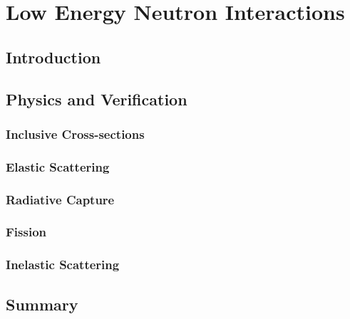 \chapter{Low Energy Neutron Interactions}
\section*{Introduction}

%
\section*{Physics and Verification}
\subsection*{Inclusive Cross-sections}

\subsection*{Elastic Scattering}

\subsection*{Radiative Capture}

\subsection*{Fission}

\subsection*{Inelastic Scattering}

\section*{Summary}


